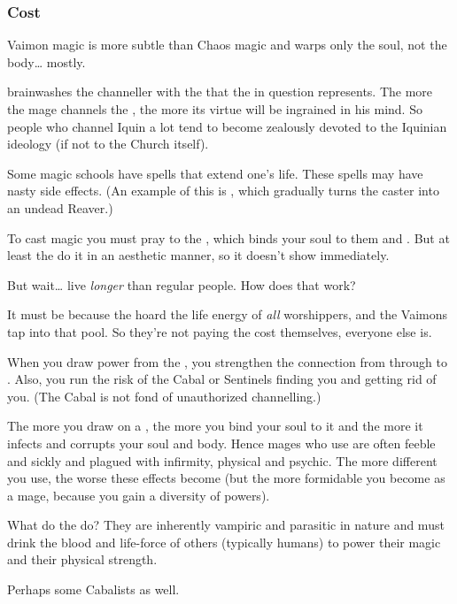 \subsubsection{Cost}
Vaimon magic is more subtle than Chaos magic and warps only the soul, not the body\ldots{} mostly.

\Iquin{} brainwashes the channeller with the  that the \Sephirah{} in question represents. The more the mage channels the \Sephirah{}, the more its virtue will be ingrained in his mind. So people who channel Iquin a lot tend to become zealously devoted to the Iquinian ideology (if not to the Church itself). 

Some magic schools have spells that extend one's life. 
These spells may have nasty side effects. 
(An example of this is , which gradually turns the caster into an undead Reaver.) 

To cast  magic you must pray to the \sephiroth, which binds your soul to them and . But at least the \sephiroth{} do it in an aesthetic manner, so it doesn't show immediately. 

But wait\ldots{}  live \emph{longer} than regular people. How does that work? 

It must be because the \sephiroth{} hoard the life energy of \emph{all} worshippers, and the Vaimons tap into that pool. So they're not paying the cost themselves, everyone else is. 

When you draw power from the \qliphoth, you strengthen the connection from \Miith{} through  to . 
Also, you run the risk of the Cabal or Sentinels finding you and getting rid of you. 
(The Cabal is not fond of unauthorized  channelling.)

The more you draw on a \qliphah, the more you bind your soul to it and the more it infects and corrupts your soul and body.
Hence mages who use \itzach are often feeble and sickly and plagued with infirmity, physical and psychic.
The more different \qliphoth you use, the worse these effects become (but the more formidable you become as a mage, because you gain a diversity of powers). 

What do the  do? They are inherently vampiric and parasitic in nature and must drink the blood and life-force of others (typically humans) to power their magic and their physical strength. 

Perhaps some Cabalists  as well.





